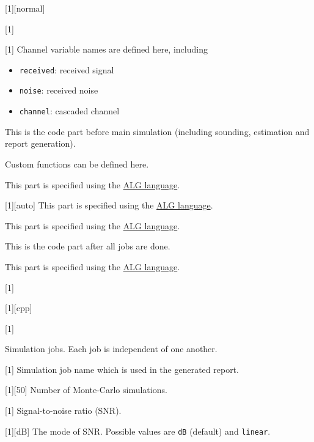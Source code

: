 [1][normal]

[1]

[1]
Channel variable names are defined here, including
\begin{itemize}[itemsep=0em]
  \item \texttt{received}: received signal
  \item \texttt{noise}: received noise
  \item \texttt{channel}: cascaded channel
\end{itemize}

This is the code part before main simulation
(including sounding, estimation and report generation).
\begin{tip}
  Custom functions can be defined here.
\end{tip}
This part is specified using the \hyperref[d:chap:alg_lang]{ALG language}.

[1][auto]
This part is specified using the \hyperref[d:chap:alg_lang]{ALG language}.

This part is specified using the \hyperref[d:chap:alg_lang]{ALG language}.

This is the code part after all jobs are done.

This part is specified using the \hyperref[d:chap:alg_lang]{ALG language}.

[1]

[1][cpp]

[1]

Simulation jobs.
Each job is independent of one another.

[1]
Simulation job name which is used in the generated report.

[1][50]
Number of Monte-Carlo simulations.

[1]
Signal-to-noise ratio (SNR).

[1][dB]
The mode of SNR. Possible values are \texttt{dB} (default) and \texttt{linear}.

